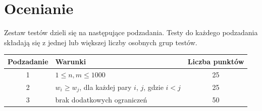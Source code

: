 \documentclass[10pt]{article}
\begin{document}
    \section*{Ocenianie}
        
    Zestaw testów dzieli się na następujące podzadania. Testy do każdego podzadania składają się z jednej lub większej liczby osobnych grup testów.
    
    \begin{center}
        \begin{tabular}{ |c|p{9cm}|c| }
            \hline
            \textbf{Podzadanie} & \textbf{Warunki} & \textbf{Liczba punktów}\\
            \hline
            1 & $1 \leq n, m \leq 1000$ & 25\\
            \hline
            2 & $w_{i}\geq w_{j}$, dla każdej pary $i$, $j$, gdzie $i < j$ & 25\\
            \hline
            3 & brak dodatkowych ograniczeń & 50\\
            \hline
        \end{tabular}
    \end{center}
\end{document}
